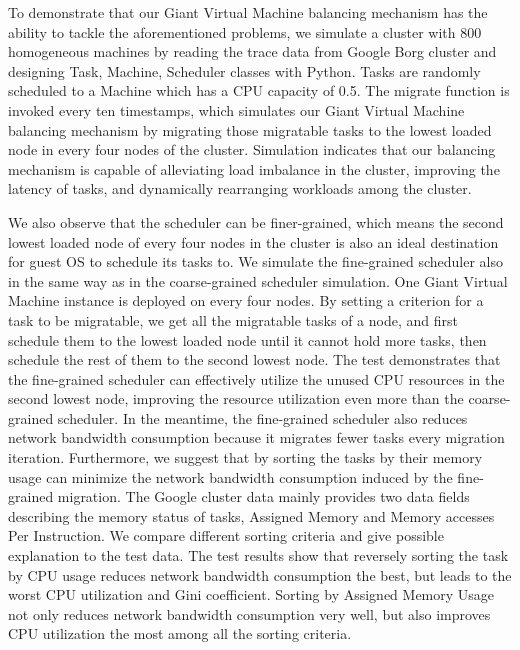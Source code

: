 \begin{bigabstract}
To demonstrate that our Giant Virtual Machine balancing mechanism has the ability to tackle the aforementioned problems, we simulate a cluster with 800 homogeneous machines by reading the trace data from Google Borg cluster and designing Task, Machine, Scheduler classes with Python. Tasks are randomly scheduled to a Machine which has a CPU capacity of 0.5. The migrate function is invoked every ten timestamps, which simulates our Giant Virtual Machine balancing mechanism by migrating those migratable tasks to the lowest loaded node in every four nodes of the cluster. Simulation indicates that our balancing mechanism is capable of alleviating load imbalance in the cluster, improving the latency of tasks, and dynamically rearranging workloads among the cluster. 

We also observe that the scheduler can be finer-grained, which means the second lowest loaded node of every four nodes in the cluster is also an ideal destination for guest OS to schedule its tasks to. We simulate the fine-grained scheduler also in the same way as in the coarse-grained scheduler simulation. One Giant Virtual Machine instance is deployed on every four nodes. By setting a criterion for a task to be migratable, we get all the migratable tasks of a node, and first schedule them to the lowest loaded node until it cannot hold more tasks, then schedule the rest of them to the second lowest node. The test demonstrates that the fine-grained scheduler can effectively utilize the unused CPU resources in the second lowest node, improving the resource utilization even more than the coarse-grained scheduler. In the meantime, the fine-grained scheduler also reduces network bandwidth consumption because it migrates fewer tasks every migration iteration. Furthermore, we suggest that by sorting the tasks by their memory usage can minimize the network bandwidth consumption induced by the fine-grained migration. The Google cluster data mainly provides two data fields describing the memory status of tasks, Assigned Memory and Memory accesses Per Instruction. We compare different sorting criteria and give possible explanation to the test data. The test results show that reversely sorting the task by CPU usage reduces network bandwidth consumption the best, but leads to the worst CPU utilization and Gini coefficient. Sorting by Assigned Memory Usage not only reduces network bandwidth consumption very well, but also improves CPU utilization the most among all the sorting criteria. 


\end{bigabstract}